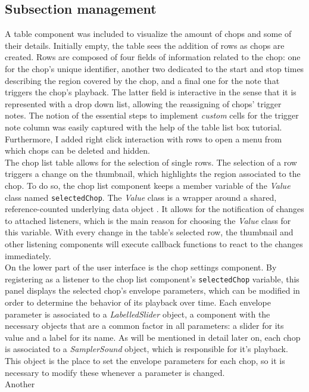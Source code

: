 \documentclass[12pt, a4paper, hidelinks]{article}
\begin{document}
	\subsection{Subsection management}
    A table component was included to visualize the amount of chops and some of their details. Initially empty, the table sees the addition of rows as chops are created. Rows are composed of four fields of information related to the chop: one for the chop's unique identifier, another two dedicated to the start and stop times describing the region covered by the chop, and a final one for the note that triggers the chop's playback.
    The latter field is interactive in the sense that it is represented with a drop down list, allowing the reassigning of chops' trigger notes. The notion of the essential steps to implement \textit{custom} cells for the trigger note column was easily captured with the help of the table list box tutorial\cite{tablelistbox}. Furthermore, I added right click interaction with rows to open a menu from which chops can be deleted and hidden.\\ %
    
	The chop list table allows for the selection of single rows. The selection of a row triggers a change on the thumbnail, which highlights the region associated to the chop. To do so, the chop list component keeps a member variable of the \textit{Value} class named \texttt{selectedChop}. The \textit{Value} class is a wrapper around a shared, reference-counted underlying data object \cite{value}. It allows for the notification of changes to attached listeners, which is the main reason for choosing the \textit{Value} class for this variable. With every change in the table's selected row, the thumbnail and other listening components will execute callback functions to react to the changes immediately.\\
	
	On the lower part of the user interface is the chop settings component. By registering as a listener to the chop list component's \texttt{selectedChop} variable, this panel displays the selected chop's envelope parameters, which can be modified in order to determine the behavior of its playback over time. Each envelope parameter is associated to a \textit{LabelledSlider} object, a component with the necessary objects that are a common factor in all parameters: a slider for its value and a label for its name. As will be mentioned in detail later on, each chop is associated to a \textit{SamplerSound} object, which is responsible for it's playback. This object is the place to set the envelope parameters for each chop, so it is necessary to modify these whenever a parameter is changed. \\
	Another 
	
\end{document}
